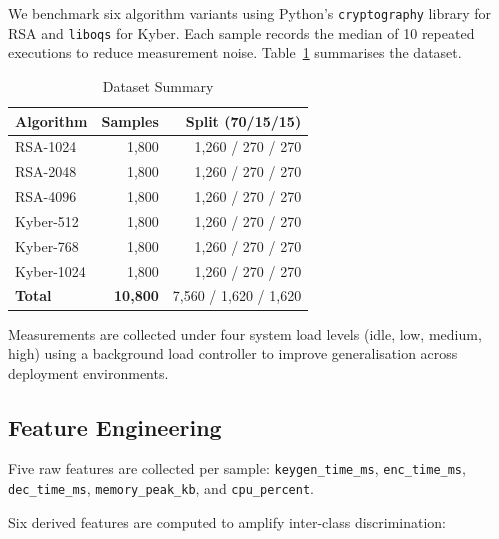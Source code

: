 \documentclass[conference]{IEEEtran}
\begin{document}
We benchmark six algorithm variants using Python's \texttt{cryptography}
library for RSA and \texttt{liboqs} \cite{liboqs} for Kyber.
Each sample records the median of 10 repeated executions to reduce
measurement noise.
Table~\ref{tab:dataset} summarises the dataset.

\begin{table}[h]
\caption{Dataset Summary}
\label{tab:dataset}
\centering
\begin{tabular}{lrr}
\toprule
\textbf{Algorithm} & \textbf{Samples} & \textbf{Split (70/15/15)} \\
\midrule
RSA-1024   & 1{,}800 & 1{,}260 / 270 / 270 \\
RSA-2048   & 1{,}800 & 1{,}260 / 270 / 270 \\
RSA-4096   & 1{,}800 & 1{,}260 / 270 / 270 \\
Kyber-512  & 1{,}800 & 1{,}260 / 270 / 270 \\
Kyber-768  & 1{,}800 & 1{,}260 / 270 / 270 \\
Kyber-1024 & 1{,}800 & 1{,}260 / 270 / 270 \\
\midrule
\textbf{Total} & \textbf{10{,}800} & 7{,}560 / 1{,}620 / 1{,}620 \\
\bottomrule
\end{tabular}
\end{table}

Measurements are collected under four system load levels (idle, low,
medium, high) using a background load controller to improve
generalisation across deployment environments.

\subsection{Feature Engineering}

Five raw features are collected per sample:
\texttt{keygen\_time\_ms}, \texttt{enc\_time\_ms}, \texttt{dec\_time\_ms},
\texttt{memory\_peak\_kb}, and \texttt{cpu\_percent}.

Six derived features are computed to amplify inter-class discrimination:
\end{document}
